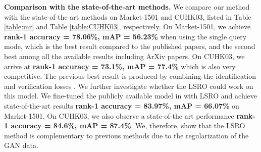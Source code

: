 \documentclass[10pt,twocolumn,letterpaper]{article}
\begin{document}
\textbf{Comparison with the state-of-the-art methods.} 
We compare our method with the state-of-the-art methods on Market-1501 and CUHK03, listed in Table \ref{table:mr} and Table \ref{table:CUHK03}, respectively. On Market-1501, we achieve \textbf{rank-1 accuracy = 78.06\%, mAP = 56.23\%} when using the single query mode, which is the best result compared to the published papers, and the second best among all the available results including ArXiv papers. On CUHK03, we arrive at \textbf{rank-1 accuracy = 73.1\%, mAP = 77.4\%} which is also very competitive. The previous best result is produced by combining the identification and verification losses \cite{geng2016deep,zheng2016discriminatively}. We further investigate whether the LSRO could work on this model. We fine-tuned the publicly available model in \cite{zheng2016discriminatively} with LSRO and achieve state-of-the-art results \textbf{rank-1 accuracy = 83.97\%, mAP = 66.07\%} on Market-1501. On CUHK03, we also observe a state-of-the art performance \textbf{rank-1 accuracy = 84.6\%, mAP = 87.4\%}. We, therefore, show that the LSRO method is complementary to previous methods due to the regularization of the GAN data. 


\end{document}

